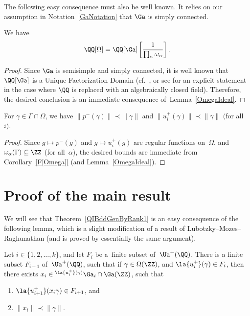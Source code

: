 The following easy consequence must also be well known.
It relies on our assumption in Notation~\ref{GaNotation} that $\Ga$ is simply connected.

\begin{cor}[cf.\ {\cite[Lemma~4.11(ii)]{MR1828742}}] \label{F[Omega]}
We have
	\[\QQ[\Omega] = \QQ[\Ga] \left[ \frac{1}{\prod_\alpha \omega_\alpha} \right] .\]
\end{cor}

\begin{proof}
Since $\Ga$ is semisimple and simply connected, it is well known that $\QQ[\Ga]$ is a Unique Factorization Domain (cf.\ \cite[Proposition~3.4]{Rosengarten-Picard}, or see \cite[Corollary~on p.~303]{Popov-Picard} for an explicit statement in the case where $\QQ$ is replaced with an algebraically closed field). Therefore, the desired conclusion is an immediate consequence of~Lemma~\ref{OmegaIdeal}.
\end{proof}

\begin{cor} \label{ubdd}
For $\gamma \in \Gamma \cap \Omega$, we have $\| p^-(\gamma) \| \prec \| \gamma \|$
and $\|u^+_i(\gamma) \| \prec \| \gamma \|$ $($for all~$i)$.
\end{cor}

\begin{proof}Since $g \mapsto p^-(g)$ and $g \mapsto u^+_i(g)$ are regular functions on~$\Omega$, and $\omega_\alpha(\Gamma) \subseteq \ZZ$ (for all~$\alpha$), the desired bounds are immediate from Corollary~\ref{F[Omega]} (and Lemma~\ref{OmegaIdeal}).
\end{proof}

\section{Proof of the main result} \label{MainProofSect}

We will see that Theorem~\ref{QIBddGenByRank1} is an easy consequence of the following lemma, which is a slight modification of a result of Lubotzky--Mozes--Raghunathan (and is proved by essentially the same argument).

\begin{lem} \label{OneStep}
Let $i \in \{1,2,\ldots,k\}$, and let $F_i$ be a~finite subset of~$\Ua^+(\QQ)$.
There is a finite subset $F_{i+1}$ of~$\Ua^+(\QQ)$, such that if $\gamma \in \Omega(\ZZ)$, and $\la{u^+_i}(\gamma) \in F_i$, then there exists $x_i \in {}^{\la{u^+_i}(\gamma)}\Ga_i \cap \Ga(\ZZ)$, such that
\begin{enumerate}\itemsep=0pt
\item[$1)$] %
	$\la{u^+_{i+1}}(x_i \gamma) \in F_{i+1}$, and
\item[$2)$] %
	$\| x_i \| \prec \| \gamma \|$.
\end{enumerate}
\end{lem}

